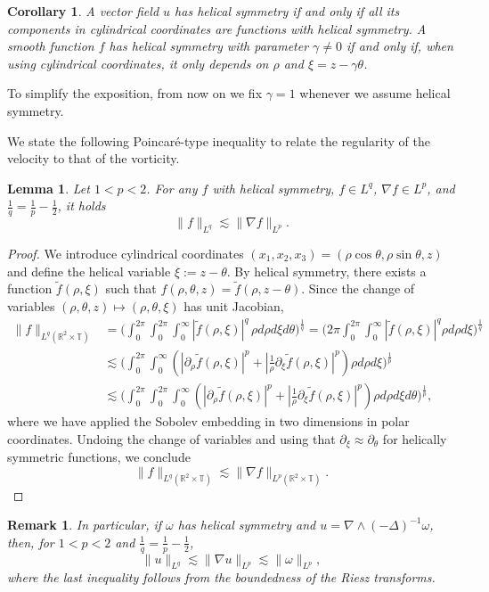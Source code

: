 \documentclass[11pt,a4paper]{article}
\newcommand{\pa}{\partial}
\newcommand{\na}{\nabla}
\newcommand{\T}{\mathbb{T}}
\newtheorem{cor}[thm]{Corollary}
\newtheorem{lemma}[thm]{Lemma}
\newtheorem{rem}[thm]{Remark}
\begin{document}
\begin{cor}
A vector field $u$ has helical symmetry if and only if all its components in cylindrical coordinates are functions with helical symmetry. A smooth function $f$ has helical symmetry with parameter $\gamma\neq 0$ if and only if, when using cylindrical coordinates, it only depends on $\rho$ and $\xi=z-\gamma \theta$. 
\end{cor}
To simplify the exposition, from now on we fix $\gamma=1$ whenever we assume helical symmetry.

We state the following Poincaré-type inequality to relate the regularity of the velocity to that of the vorticity.   

\begin{lemma}\label{lem:helicalembedding}
Let $1<p<2$. For any $f$ with helical symmetry, $f\in L^q$, $\na f\in L^p$, and $\frac{1}{q}=\frac{1}{p}-\frac{1}{2}$, it holds
$$\|f\|_{L^q}\lesssim \|\na f\|_{L^p}.$$
\end{lemma}
\begin{proof}
We introduce cylindrical coordinates
$
(x_1,x_2,x_3)=(\rho\cos\theta,\rho\sin\theta,z)
$
and define the helical variable
$
\xi := z-\theta.
$
By helical symmetry, there exists a function $\tilde f(\rho ,\xi)$ such that
$
f(\rho,\theta,z)=\tilde f(\rho,z-\theta).
$
Since the change of variables $(\rho,\theta,z)\mapsto(\rho,\theta,\xi)$ has unit Jacobian,
$$
\begin{aligned}
\|f\|_{L^q(\mathbb{R}^2\times \T)}
&= \Big(\int_0^{2\pi}\int_0^{2\pi}\int_0^\infty
|\tilde f(\rho,\xi)|^q \, \rho d\rho d\xi d\theta\Big)^\frac{1}{q}
=\Big(2\pi\int_0^{2\pi}\int_0^\infty
|\tilde f(\rho,\xi)|^q  \rho d\rho d\xi\Big)^\frac{1}{q}\\
&\lesssim \Big(\int_0^{2\pi}\int_0^\infty
(|\pa_\rho \tilde f(\rho,\xi)|^p+|\frac{1}{\rho}\pa_\xi \tilde f(\rho,\xi)|^p) \rho d\rho d\xi\Big)^\frac{1}{p} \\
&\lesssim \Big(\int_0^{2\pi}\int_0^{2\pi}\int_0^\infty
(|\pa_\rho \tilde f(\rho,\xi)|^p+|\frac{1}{\rho}\pa_\xi \tilde f(\rho,\xi)|^p) \rho d\rho d\xi d\theta\Big)^\frac{1}{p},
\end{aligned}
$$
where we have applied the Sobolev embedding in two dimensions in polar coordinates. Undoing the change of variables and using that $\partial_\xi \approx \pa_\theta$ for helically symmetric functions, we conclude
$$
\|f\|_{L^q(\mathbb{R}^2\times \T)}
\lesssim \|\na f\|_{L^p(\mathbb{R}^2\times \T)}.$$
\end{proof}

\begin{rem}\label{uregularity} In particular, if $\omega$ has helical symmetry and $u=\nabla\wedge(-\Delta)^{-1}\omega$,
then, for $1<p<2$ and $\frac1q=\frac1p-\frac12$,
\[
\|u\|_{L^q}
 \lesssim \|\nabla u\|_{L^p}
 \lesssim \|\omega\|_{L^p},
\]
where the last inequality follows from the boundedness of the Riesz
transforms.
\end{rem}
\end{document}
